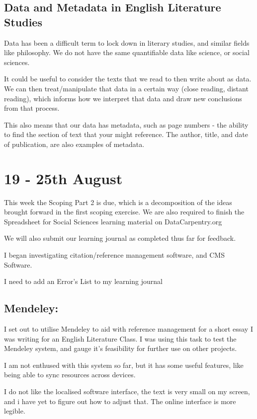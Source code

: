 \documentclass{article}
\begin{document}
\subsection{Data and Metadata in English Literature Studies}

Data has been a difficult term to lock down in literary studies, and similar fields like philosophy. We do not have the same quantifiable data like science, or social sciences. 

It could be useful to consider the texts that we read to then write about as data. We can then treat/manipulate that data in a certain way (close reading, distant reading), which informs how we interpret that data and draw new conclusions from that process. 

This also means that our data has metadata, such as page numbers - the ability to find the section of text that your might reference. The author, title, and date of publication, are also examples of metadata.

\section{19 - 25th August}
This week the Scoping Part 2 is due, which is a decomposition of the ideas brought forward in the first scoping exercise. 
We are also required to finish the Spreadsheet for Social Sciences learning material on DataCarpentry.org

We will also submit our learning journal as completed thus far for feedback. 

I began investigating citation/reference management software, and CMS Software. 

I need to add an Error's List to my learning journal

\subsection{Mendeley:}
I set out to utilise Mendeley to aid with reference management for a short essay I was writing for an English Literature Class. 
I was using this task to test the Mendeley system, and gauge it's feasibility for further use on other projects. 

I am not enthused with this system so far, but it has some useful features, like being able to sync resources across devices. 

I do not like the localised software interface, the text is very small on my screen, and i have yet to figure out how to adjust that. The online interface is more legible. 
\end{document}
